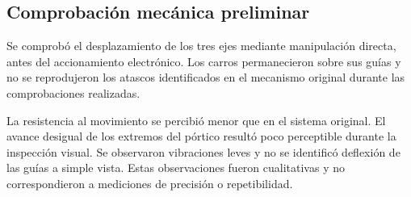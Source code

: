 \subsection{Comprobación mecánica preliminar}

Se comprobó el desplazamiento de los tres ejes mediante manipulación directa, antes del accionamiento electrónico. Los carros permanecieron sobre sus guías y no se reprodujeron los atascos identificados en el mecanismo original durante las comprobaciones realizadas.

La resistencia al movimiento se percibió menor que en el sistema original. El avance desigual de los extremos del pórtico resultó poco perceptible durante la inspección visual. Se observaron vibraciones leves y no se identificó deflexión de las guías a simple vista. Estas observaciones fueron cualitativas y no correspondieron a mediciones de precisión o repetibilidad.
